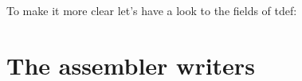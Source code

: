 \documentclass{report}
\begin{document}
To make it more clear let's have a look to the fields of tdef:







\chapter{The assembler writers}
\end{document}
